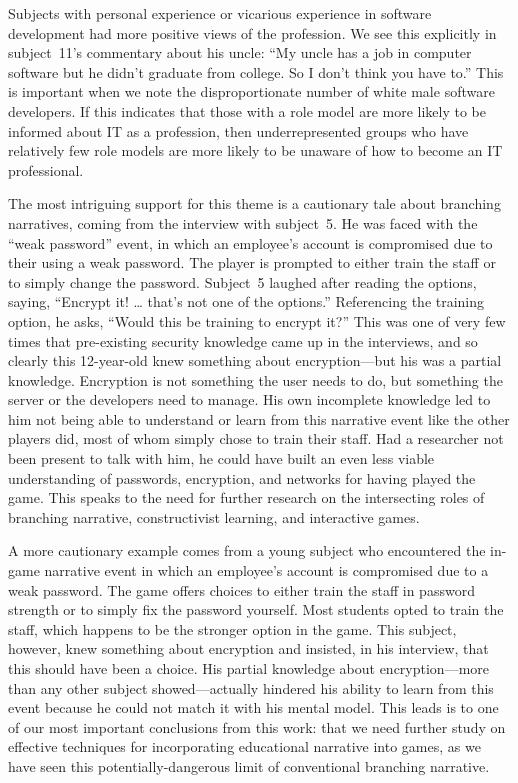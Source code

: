 \documentclass[letterpaper]{article}
\begin{document}
Subjects with personal experience or vicarious experience in software
development had more positive views of the profession.
We see this explicitly in subject~11's commentary about his uncle:
``My uncle has a
job in computer software but he didn’t graduate from college. So I
don’t think you have to.'' This is important when we note the
disproportionate number of white male software developers. If this
indicates that those with a role model are more likely to be informed
about IT as a profession, then underrepresented groups 
who have relatively few role models are more likely
to be unaware of how to become an IT professional.

The most intriguing support for this theme is a cautionary
tale about branching narratives, coming from the interview with
subject~5. He was faced with the ``weak password'' event, in which
an employee's account is compromised due to their using a weak password.
The player is prompted to either train the staff or to simply change 
the password. Subject~5 laughed after reading the options, saying,
``Encrypt it! \ldots{} that's not one of the options.'' Referencing
the training option, he asks, ``Would this be training to encrypt it?''
This was one of very few times that pre-existing security knowledge
came up in the interviews, and so clearly this 12-year-old knew something
about encryption---but his was a partial knowledge. Encryption is not
something the user needs to do, but something the server or the developers
need to manage. His own incomplete knowledge led to him not being
able to understand or learn from this narrative event like the other
players did, most of whom simply chose to train their staff.
Had a researcher not been present to talk with him, he could have built
an even less viable understanding of passwords, encryption, and networks
for having played the game.
This speaks to the need for further research on the intersecting roles
of branching narrative, constructivist learning, and interactive games.

A more cautionary example comes from a young subject
who encountered the in-game narrative event in which an employee's
account is compromised due to a weak password. The game offers choices
to either train the staff in password strength or to simply fix the password
yourself. Most students opted to train the staff, which happens to be
the stronger option in the game. This subject, however, knew something
about encryption and insisted, in his interview, that this should have
been a choice. His partial knowledge about encryption---more than any
other subject showed---actually hindered his ability to learn from
this event because he could not match it with his mental model.
This leads is to one of our most important conclusions from this work:
that we need further study on effective techniques for incorporating 
educational narrative into games, as we have seen this potentially-dangerous
limit of conventional branching narrative.
\end{document}
